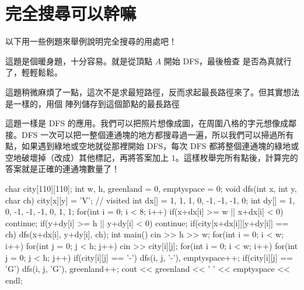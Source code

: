\documentclass[main.tex]{subfiles}
\begin{document}
\section{完全搜尋可以幹嘛}
以下用一些例題來舉例說明完全搜尋的用處吧！\\


這題是個暖身題，十分容易。就是從頂點 $A$ 開始 DFS，最後檢查  是否為真就行了，輕輕鬆鬆。\\


這題稍微麻煩了一點，這次不是求最短路徑，反而求起最長路徑來了。但其實想法是一樣的，用個  陣列儲存到這個節點的最長路徑\\


這題一樣是 DFS 的應用。我們可以把照片想像成圖，在周圍八格的字元想像成鄰接。DFS 一次可以把一整個連通塊的地方都搜尋過一遍，所以我們可以掃過所有點，如果遇到綠地或空地就從那裡開始 DFS，每次 DFS 都將整個連通塊的綠地或空地破壞掉（改成）其他標記，再將答案加上 $1$。這樣枚舉完所有點後，計算完的答案就是正確的連通塊數量了！\\

\begin{C++}
char city[110][110];
int w, h, greenland = 0, emptyspace = 0;
void dfs(int x, int y, char ch){
    city[x][y] = 'V'; // visited
    int dx[] = {1,  1,  1,  0, -1, -1, -1,  0};
    int dy[] = {1,  0, -1, -1, -1,  0,  1,  1};
    for(int i = 0; i < 8; i++){
        if(x+dx[i] >= w || x+dx[i] < 0) continue;
        if(y+dy[i] >= h || y+dy[i] < 0) continue;
        if(city[x+dx[i]][y+dy[i]] == ch){
            dfs(x+dx[i], y+dy[i], ch);
        }
    }
}
int main(){
    cin >> h >> w;
    for(int i = 0; i < w; i++){
        for(int j = 0; j < h; j++)
            cin >> city[i][j];
    }
    for(int i = 0; i < w; i++){
        for(int j = 0; j < h; j++){
            if(city[i][j] == '-')
                dfs(i, j, '-'), emptyspace++;
            if(city[i][j] == 'G')
                dfs(i, j, 'G'), greenland++;
        }
    }
    cout << greenland << ' ' << emptyspace << endl;
}

\end{C++}
\end{document}
